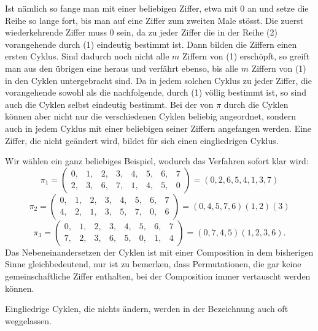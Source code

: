 
Ist nämlich
so fange man mit einer beliebigen Ziffer, etwa mit 0 an und setze die Reihe
so lange fort, bis man auf eine Ziffer zum zweiten Male stösst. Die zuerst wiederkehrende Ziffer muss 0 sein, da zu jeder Ziffer die in der Reihe (2) vorangehende durch (1) eindeutig bestimmt ist. Dann bilden die Ziffern
einen ersten Cyklus. Sind dadurch noch nicht alle $m$ Ziffern von (1) erschöpft, so greift man aus den übrigen eine heraus und verfährt ebenso, bis alle $m$ Ziffern von (1) in den Cyklen untergebracht sind. Da in jedem solchen Cyklus zu jeder Ziffer, die vorangehende sowohl als die nachfolgende, durch (1) völlig bestimmt ist, so sind auch die Cyklen selbst eindeutig bestimmt. Bei der  von $\pi$ durch die Cyklen können aber nicht nur die verschiedenen Cyklen beliebig angeordnet, sondern auch in jedem Cyklus mit einer beliebigen seiner Ziffern angefangen werden. Eine Ziffer, die nicht geändert wird, bildet für sich einen eingliedrigen Cyklus.

Wir wählen ein ganz beliebiges Beispiel, wodurch das Verfahren sofort klar wird:
\[
\pi_1 = \begin{pmatrix} 0, & 1, & 2, & 3, & 4, & 5, & 6, & 7 \\ 2, & 3, & 6, & 7, & 1, & 4, & 5, & 0 \end{pmatrix} = (0, 2, 6, 5, 4, 1, 3, 7)
\]
\[
\pi_2 = \begin{pmatrix} 0, & 1, & 2, & 3, & 4, & 5, & 6, & 7 \\ 4, & 2, & 1, & 3, & 5, & 7, & 0, & 6 \end{pmatrix} = (0, 4, 5, 7, 6)(1, 2)(3)
\]
\[
\pi_3 = \begin{pmatrix} 0, & 1, & 2, & 3, & 4, & 5, & 6, & 7 \\ 7, & 2, & 3, & 6, & 5, & 0, & 1, & 4 \end{pmatrix} = (0, 7, 4, 5)(1, 2, 3, 6).
\]
Das Nebeneinandersetzen der Cyklen ist mit einer Composition in dem bisherigen Sinne gleichbedeutend, nur ist zu bemerken, dass Permutationen, die gar keine gemeinschaftliche Ziffer enthalten, bei der Composition immer vertauscht werden können.

Eingliedrige Cyklen, die nichts ändern, werden in der Bezeichnung auch oft weggelassen.
